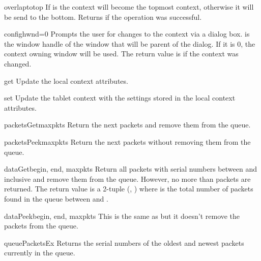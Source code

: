 \begin{methoddesc}{overlap}{totop}
If  is  the context will become the topmost context,
otherwise it will be send to the bottom.
Returns  if the operation was successful.
\end{methoddesc}

\begin{methoddesc}{config}{hwnd=0}
Prompts the user for changes to the context via a dialog box. 
is the window handle of the window that will be parent of the dialog.
If it is 0, the context owning window will be used.
The return value is  if the context was changed.
\end{methoddesc}

\begin{methoddesc}{get}{}
Update the local context attributes.
\end{methoddesc}

\begin{methoddesc}{set}{}
Update the tablet context with the settings stored in the local context
attributes.
\end{methoddesc}

\begin{methoddesc}{packetsGet}{maxpkts}
Return the next  packets and remove them from the queue.
\end{methoddesc}

\begin{methoddesc}{packetsPeek}{maxpkts}
Return the next  packets without removing them from the queue.
\end{methoddesc}

\begin{methoddesc}{dataGet}{begin, end, maxpkts}
Return all packets with serial numbers between  and 
inclusive and remove them from the queue. However, no more than 
packets are returned.
The return value is a 2-tuple (, ) where
 is the total number of packets found in the queue between
 and .
\end{methoddesc}

\begin{methoddesc}{dataPeek}{begin, end, maxpkts}
This is the same as  but it doesn't remove the packets
from the queue.
\end{methoddesc}

\begin{methoddesc}{queuePacketsEx}{}
Returns the serial numbers of the oldest and newest packets currently
in the queue.
\end{methoddesc}

